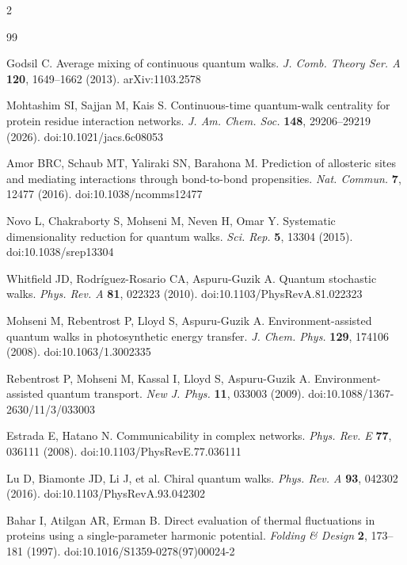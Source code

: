 \documentclass[10pt,a4paper]{article}
\begin{document}
\footnotesize
\setlength{\columnsep}{16pt}
\begin{multicols}{2}
\begin{thebibliography}{99}
\setlength{\itemsep}{0pt}\setlength{\parskip}{0pt}\linespread{0.95}\selectfont

 Godsil C. Average mixing of continuous quantum walks.
  \textit{J. Comb. Theory Ser. A} \textbf{120}, 1649--1662 (2013). arXiv:1103.2578

 Mohtashim SI, Sajjan M, Kais S. Continuous-time quantum-walk centrality for
  protein residue interaction networks. \textit{J. Am. Chem. Soc.} \textbf{148}, 29206--29219 (2026).
  doi:10.1021/jacs.6c08053

 Amor BRC, Schaub MT, Yaliraki SN, Barahona M. Prediction of allosteric sites and
  mediating interactions through bond-to-bond propensities. \textit{Nat. Commun.} \textbf{7}, 12477
  (2016). doi:10.1038/ncomms12477

 Novo L, Chakraborty S, Mohseni M, Neven H, Omar Y. Systematic dimensionality
  reduction for quantum walks. \textit{Sci. Rep.} \textbf{5}, 13304 (2015). doi:10.1038/srep13304

 Whitfield JD, Rodr\'iguez-Rosario CA, Aspuru-Guzik A. Quantum stochastic
  walks. \textit{Phys. Rev. A} \textbf{81}, 022323 (2010). doi:10.1103/PhysRevA.81.022323

 Mohseni M, Rebentrost P, Lloyd S, Aspuru-Guzik A. Environment-assisted quantum
  walks in photosynthetic energy transfer. \textit{J. Chem. Phys.} \textbf{129}, 174106 (2008).
  doi:10.1063/1.3002335

 Rebentrost P, Mohseni M, Kassal I, Lloyd S, Aspuru-Guzik A.
  Environment-assisted quantum transport. \textit{New J. Phys.} \textbf{11}, 033003 (2009).
  doi:10.1088/1367-2630/11/3/033003

 Estrada E, Hatano N. Communicability in complex networks.
  \textit{Phys. Rev. E} \textbf{77}, 036111 (2008). doi:10.1103/PhysRevE.77.036111

 Lu D, Biamonte JD, Li J, et al. Chiral quantum walks. \textit{Phys. Rev. A}
  \textbf{93}, 042302 (2016). doi:10.1103/PhysRevA.93.042302

 Bahar I, Atilgan AR, Erman B. Direct evaluation of thermal fluctuations in
  proteins using a single-parameter harmonic potential. \textit{Folding \& Design} \textbf{2},
  173--181 (1997). doi:10.1016/S1359-0278(97)00024-2


\end{thebibliography}
\end{multicols}
\end{document}
